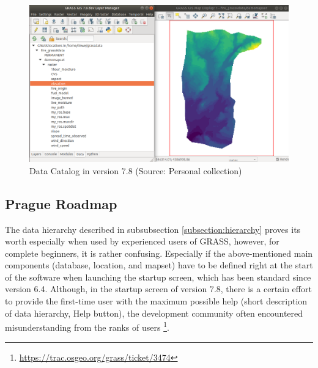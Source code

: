 \documentclass[a4paper,10pt,twoside]{article}
\begin{document}
\vspace{0.3cm}
\begin{figure}[hbt!] 
\begin{center}
\includegraphics[width=17cm]{../pictures/data_catalog_pred.png} 
\caption[Data Catalog in version 7.8]{Data Catalog in version 7.8 (Source: Personal collection)}
\label{fig:data_catalog_pred}
\end{center}
\end{figure}

\newpage
\vspace*{-1cm}
\subsection{Prague Roadmap}
\label{section:Prague Roadmap}
\noindent
\large
The data hierarchy described in subsubsection \ref{subsection:hierarchy} proves its worth especially when used by experienced users of GRASS, however, for complete beginners, it is rather confusing. Especially if the above-mentioned main components (database, location, and mapset) have to be defined right at the start of the software when launching the startup screen, which has been standard since version 6.4.  Although, in the startup screen of version 7.8, there is a certain effort to provide the first-time user with the maximum possible help (short description of data hierarchy, Help button), the development community often encountered misunderstanding from the ranks of users \footnote{\url{https://trac.osgeo.org/grass/ticket/3474}}. 
\end{document}
